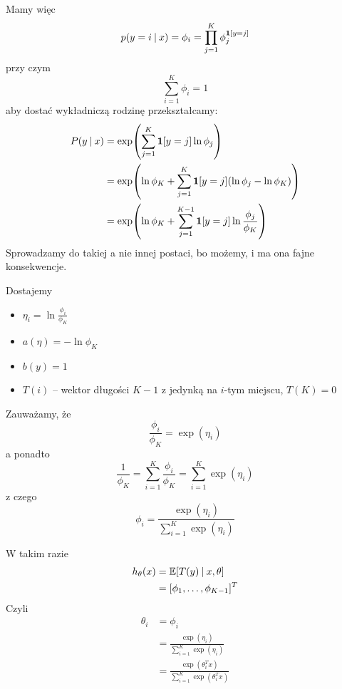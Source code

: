 Mamy więc 
\[
    p(y = i \:\vert\: x) = \phi_i = \prod_{j=1}^K \phi_j^{\mathbf{1}\left[y=j\right]}
\]
przy czym
\[
    \sum_{i=1}^K \phi_i = 1
\]
aby dostać wykładniczą rodzinę przekształcamy:
\begin{align*}
    P(y \given x)
        &= \exp\pars{\sum_{j=1}^K \indicator{y = j} \ln \phi_j} \\
        &= \exp\pars{\ln \phi_K + \sum_{j=1}^K \indicator{y = j} (\ln \phi_j - \ln \phi_K)} \\
        &= \exp\pars{\ln \phi_K + \sum_{j=1}^{K-1} \indicator{y = j} \ln \frac{\phi_j}{\phi_K}} \\
\end{align*}
Sprowadzamy do takiej a nie innej postaci, bo możemy, i ma ona fajne konsekwencje.

Dostajemy
\begin{itemize}
    \item \( \eta_i  = \ln \frac{\phi_i}{\phi_K} \)
    \item \( a(\eta) = -\ln \phi_K \)
    \item \( b(y) = 1 \)
    \item \( T(i) \) -- wektor długości \( K - 1 \) z jedynką na \(i\)-tym miejscu, \( T(K) = 0 \)
\end{itemize}

Zauważamy, że 
\[
    \frac{\phi_i}{\phi_K} = \exp(\eta_i)
\]
a ponadto
\[
    \frac{1}{\phi_K} = \sum_{i=1}^K \frac{\phi_i}{\phi_K} = \sum_{i=1}^K \exp(\eta_i)
\]
z czego
\[
    \phi_i = \frac{\exp(\eta_i)}{\sum_{i=1}^K \exp(\eta_i)}
\]

W takim razie
\begin{align*}
    h_\theta(x) 
        &= \expected{T(y) \given x, \theta} \\
        &= [\phi_1, \dots, \phi_{K-1}]^T 
\end{align*}
Czyli
\begin{align*}
    \theta_i 
        &= \phi_i \\
        &= \frac{\exp(\eta_i)}{\sum_{i=1}^K \exp(\eta_i)} \\
        &= \frac{\exp(\theta^T_i x)}{\sum_{i=1}^K \exp(\theta^T_i x)}
\end{align*}